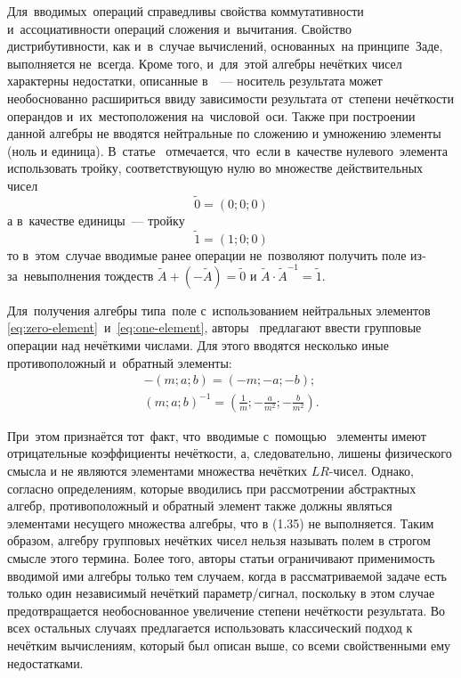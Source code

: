Для~вводимых~операций справедливы свойства коммутативности и~ассоциативности операций сложения и~вычитания. Свойство дистрибутивности, как и~в~случае вычислений, основанных~на принципе~Заде, выполняется не~всегда. Кроме того, и~для~этой алгебры нечётких чисел характерны недостатки, описанные в~\cite{Spesivtsev, Yakhyaeva}~--– носитель результата может необоснованно расшириться ввиду зависимости результата от~степени нечёткости операндов и~их~местоположения на~числовой~оси. Также при построении данной алгебры не вводятся нейтральные по сложению и умножению элементы (ноль и единица). В~статье~\cite{Uskov_PPS} отмечается, что~если в~качестве нулевого~элемента использовать тройку, соответствующую нулю во множестве действительных чисел
\begin{equation}
\label{eq:zero-element}
	\tilde{0}=\left( 0;0;0 \right)
\end{equation}
а в~качестве единицы~--– тройку
\begin{equation}
\label{eq:one-element}
	\tilde{1}=\left( 1;0;0 \right)
\end{equation}
то в~этом~случае вводимые ранее операции не~позволяют получить поле из-за~невыполнения тождеств $\tilde{A}+\left( -\tilde{A} \right)=\tilde{0}$ и $\tilde{A}\cdot {{\tilde{A}}^{-1}}=\tilde{1}$.

Для~получения алгебры типа~поле с~использованием нейтральных элементов \eqref{eq:zero-element}~и~\eqref{eq:one-element}, авторы~\cite{Uskov_PPS} предлагают ввести групповые операции над нечёткими числами. Для этого вводятся несколько иные противоположный и~обратный элементы:
\begin{gather}
	\label{eq:reverse-minus-element}
	-\left( m;a;b \right)=\left( -m;-a;-b \right); \\ 
	\label{eq:reverse-div-element}
	\left( m;a;b \right)^{-1}=\left( \frac{1}{m};-\frac{a}{{{m}^{2}}};-\frac{b}{{{m}^{2}}} \right). 
\end{gather}

При~этом признаётся тот~факт, что~вводимые с~помощью~  элементы имеют отрицательные коэффициенты нечёткости, а, следовательно, лишены физического смысла и не являются элементами множества нечётких $LR$-чисел. Однако, согласно определениям, которые вводились при рассмотрении абстрактных алгебр, противоположный и обратный элемент также должны являться элементами несущего множества алгебры, что в (1.35) не выполняется. Таким образом, алгебру групповых нечётких чисел нельзя называть полем в строгом смысле этого термина. Более того, авторы статьи ограничивают применимость вводимой ими алгебры только тем случаем, когда в рассматриваемой задаче есть только один независимый нечёткий параметр/сигнал, поскольку в этом случае предотвращается необоснованное увеличение степени нечёткости результата. Во всех остальных случаях предлагается использовать классический подход к нечётким вычислениям, который был описан выше, со всеми свойственными ему недостатками.

